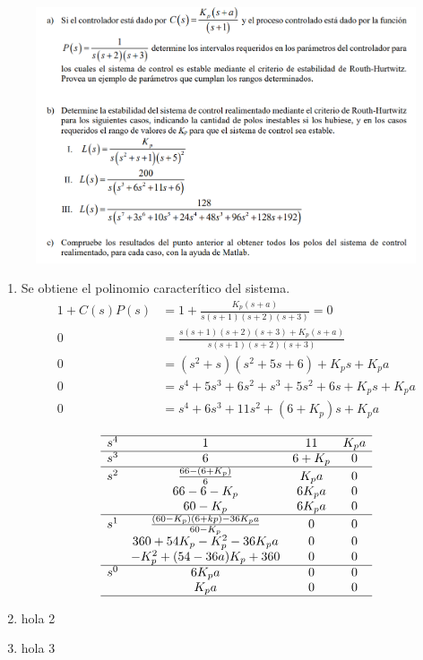 \renewcommand{\theenumi}{\large\bfseries\alph{enumi}}

\begin{ejercicio}
  \begin{figure}[H]
    \centering
    \includegraphics[width=\textwidth]{./tarea2/enunciado.png}
  \end{figure}
  \begin{enumerate}
    \item 
    Se obtiene el polinomio caracterítico del sistema.
    \begin{align*}
      1+C(s)P(s) &= 1+\frac{K_p(s+a)}{s(s+1)(s+2)(s+3)} = 0
      \\
      0 &= \frac{s(s+1)(s+2)(s+3)+K_p(s+a)}{s(s+1)(s+2)(s+3)}
      \\
      0 &= (s^2+s)(s^2+5s+6)+K_ps+K_pa
      \\
      0 &= s^4+5s^3+6s^2+s^3+5s^2+6s+K_ps+K_pa
      \\
      0 &= s^4+6s^3+11s^2+(6+K_p)s+K_pa
    \end{align*}

\renewcommand{\arraystretch}{1.5}
  \[
    \begin{matrix}
    \hline
    s^4 & 1 & 11 & K_p a
    \\\hline
    s^3 & 6 & 6+K_p & 0
    \\\hline
    s^2 & \frac{66-(6+K_p)}{6} & K_p a & 0
    \\
     & 66-6-K_p & 6K_p a & 0
    \\
     & 60-K_p & 6K_p a & 0
    \\\hline
    s^1 & \frac{(60-K_p)(6+kp)-36K_p a}{60-K_p} & 0 & 0 
    \\
     & 360+54K_p-K_p^2 - 36K_p a & 0 & 0
    \\
     & -K_p^2 + (54-36a)K_p + 360 & 0 & 0
    \\\hline
    s^0 & 6K_p a & 0 & 0
    \\
     & K_p a & 0 & 0
    \\\hline
    \end{matrix}
  \]

    \item hola 2

    \item hola 3
  \end{enumerate}
\end{ejercicio}